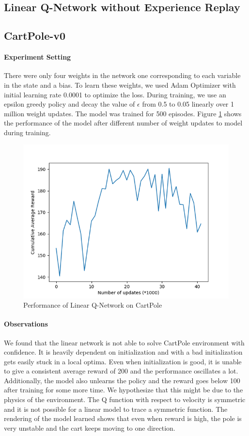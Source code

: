 \documentclass[12pt]{article}
\begin{document}
\pagebreak[4]

\subsection{Linear Q-Network without Experience Replay}
\subsection*{CartPole-v0}
\paragraph{Experiment Setting} There were only four weights in the network one corresponding to each variable in the state and a bias. To learn these weights, we used Adam Optimizer with initial learning rate 0.0001 to optimize the loss. During training, we use an epsilon greedy policy and decay the value of $\epsilon$ from 0.5 to 0.05 linearly over 1 million weight updates. The model was trained for 500 episodes. Figure \ref{fig:01} shows the performance of the model after different number of weight updates to model during training.
\begin{figure}[h]
  \centering
  \vspace{-5mm}
  \includegraphics[width=0.8\linewidth]{figures/reward_plot_01.png}
  \caption{Performance of Linear Q-Network on CartPole}
  \label{fig:01}
\end{figure}
\paragraph{Observations} We found that the linear network is not able to solve CartPole environment with confidence. It is heavily dependent on initialization and with a bad initialization gets easily stuck in a local optima. Even when initialization is good, it is unable to give a consistent average reward of 200 and the performance oscillates a lot. Additionally, the model also unlearns the policy and the reward goes below 100 after training for some more time. We hypothesize that this might be due to the physics of the environment. The Q function with respect to velocity is symmetric and it is not possible for a linear model to trace a symmetric function. The rendering of the model learned shows that even when reward is high, the pole is very unstable and the cart keeps moving to one direction.
\end{document}
